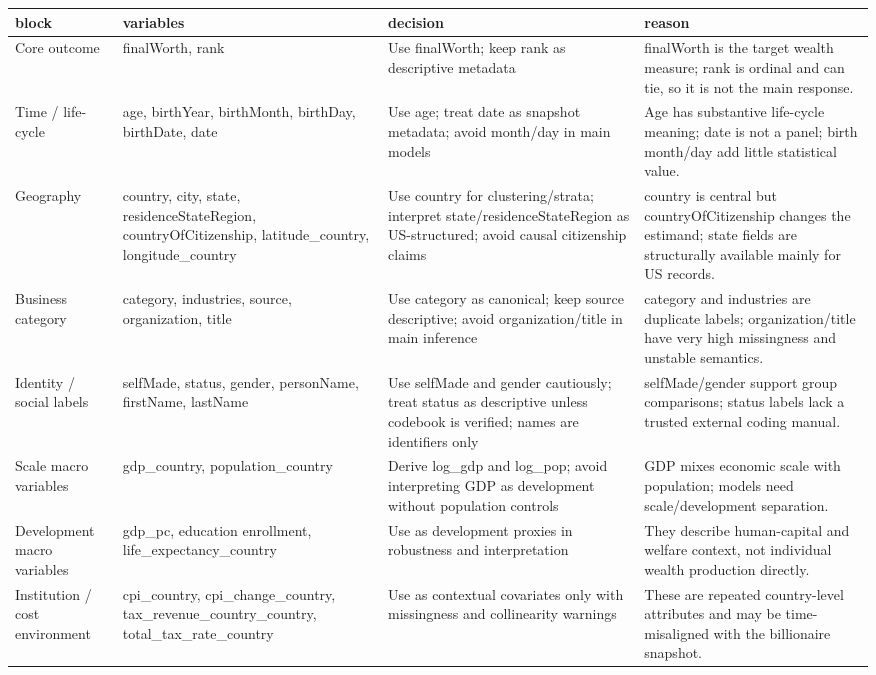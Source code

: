 \begin{tabular}{llll}
\toprule
block & variables & decision & reason \\
\midrule
Core outcome & finalWorth, rank & Use finalWorth; keep rank as descriptive metadata & finalWorth is the target wealth measure; rank is ordinal and can tie, so it is not the main response. \\
Time / life-cycle & age, birthYear, birthMonth, birthDay, birthDate, date & Use age; treat date as snapshot metadata; avoid month/day in main models & Age has substantive life-cycle meaning; date is not a panel; birth month/day add little statistical value. \\
Geography & country, city, state, residenceStateRegion, countryOfCitizenship, latitude\_country, longitude\_country & Use country for clustering/strata; interpret state/residenceStateRegion as US-structured; avoid causal citizenship claims & country is central but countryOfCitizenship changes the estimand; state fields are structurally available mainly for US records. \\
Business category & category, industries, source, organization, title & Use category as canonical; keep source descriptive; avoid organization/title in main inference & category and industries are duplicate labels; organization/title have very high missingness and unstable semantics. \\
Identity / social labels & selfMade, status, gender, personName, firstName, lastName & Use selfMade and gender cautiously; treat status as descriptive unless codebook is verified; names are identifiers only & selfMade/gender support group comparisons; status labels lack a trusted external coding manual. \\
Scale macro variables & gdp\_country, population\_country & Derive log\_gdp and log\_pop; avoid interpreting GDP as development without population controls & GDP mixes economic scale with population; models need scale/development separation. \\
Development macro variables & gdp\_pc, education enrollment, life\_expectancy\_country & Use as development proxies in robustness and interpretation & They describe human-capital and welfare context, not individual wealth production directly. \\
Institution / cost environment & cpi\_country, cpi\_change\_country, tax\_revenue\_country\_country, total\_tax\_rate\_country & Use as contextual covariates only with missingness and collinearity warnings & These are repeated country-level attributes and may be time-misaligned with the billionaire snapshot. \\
\bottomrule
\end{tabular}
